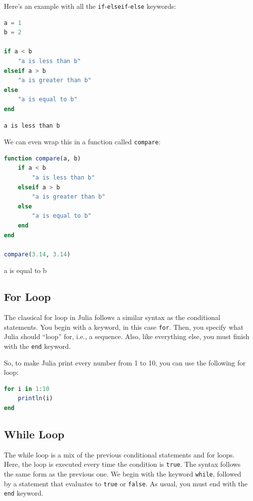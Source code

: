 \documentclass[
  notoc %
]{tufte-book}
\newcommand{\passthrough}[1]{#1}
\begin{document}
Here's an example with all the
\passthrough{\lstinline!if!}-\passthrough{\lstinline!elseif!}-\passthrough{\lstinline!else!}
keywords:

\begin{lstlisting}[language=Julia]
a = 1
b = 2

if a < b
    "a is less than b"
elseif a > b
    "a is greater than b"
else
    "a is equal to b"
end
\end{lstlisting}

\begin{lstlisting}[language=Output]
a is less than b
\end{lstlisting}

We can even wrap this in a function called
\passthrough{\lstinline!compare!}:

\begin{lstlisting}[language=Julia]
function compare(a, b)
    if a < b
        "a is less than b"
    elseif a > b
        "a is greater than b"
    else
        "a is equal to b"
    end
end

compare(3.14, 3.14)
\end{lstlisting}

a is equal to b

\hypertarget{sec:for}{%
\subsection{For Loop}\label{sec:for}}

The classical for loop in Julia follows a similar syntax as the
conditional statements. You begin with a keyword, in this case
\passthrough{\lstinline!for!}. Then, you specify what Julia should
``loop'' for, i.e., a sequence. Also, like everything else, you must
finish with the \passthrough{\lstinline!end!} keyword.

So, to make Julia print every number from 1 to 10, you can use the
following for loop:

\begin{lstlisting}[language=Julia]
for i in 1:10
    println(i)
end
\end{lstlisting}

\hypertarget{sec:while}{%
\subsection{While Loop}\label{sec:while}}

The while loop is a mix of the previous conditional statements and for
loops. Here, the loop is executed every time the condition is
\passthrough{\lstinline!true!}. The syntax follows the same form as the
previous one. We begin with the keyword \passthrough{\lstinline!while!},
followed by a statement that evaluates to \passthrough{\lstinline!true!}
or \passthrough{\lstinline!false!}. As usual, you must end with the
\passthrough{\lstinline!end!} keyword.
\end{document}

